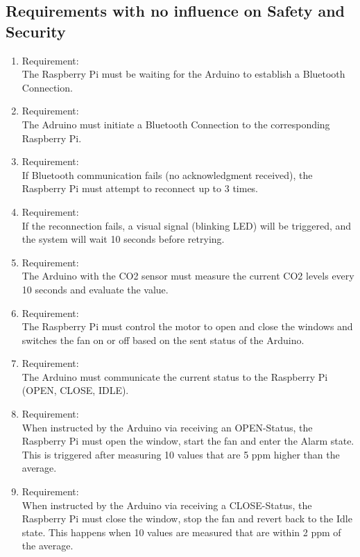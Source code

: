\subsection{Requirements with no influence on Safety and Security}
    \begin{enumerate}[label*=\arabic*.]
        \item \label{qreq.1}  Requirement:  \\
        The Raspberry Pi must be waiting for the Arduino to establish a Bluetooth Connection. \\ 
        \item \label{qreq.2}  Requirement:  \\
        The Adruino must initiate a Bluetooth Connection to the corresponding Raspberry Pi. \\ 
        \item \label{qreq.3}  Requirement:  \\
        If Bluetooth communication fails (no acknowledgment received), the Raspberry Pi must attempt to reconnect up to 3 times. \\ 
        \item \label{qreq.4}  Requirement:  \\
        If the reconnection fails, a visual signal (blinking LED) will be triggered, and the system will wait 10 seconds before retrying. \\ 
        \item \label{qreq.5}  Requirement:  \\
        The Arduino with the CO2 sensor must measure the current CO2 levels every 10 seconds and evaluate the value. \\ 
        \item \label{qreq.6}  Requirement:  \\
        The Raspberry Pi must control the motor to open and close the windows and switches the fan on or off based on the sent status of the Arduino.\\ 
        \item \label{qreq.7}  Requirement:  \\
        The Arduino must communicate the current status to the Raspberry Pi (OPEN, CLOSE, IDLE).\\ 
        \item \label{qreq.8}  Requirement:  \\
        When instructed by the Arduino via receiving an OPEN-Status, the Raspberry Pi must open the window, start the fan and enter the Alarm state. This is triggered after measuring 10 values that are 5 ppm higher than the average.\\ 
        \item \label{qreq.9}  Requirement:  \\
        When instructed by the Arduino via receiving a CLOSE-Status, the Raspberry Pi must close the window, stop the fan and revert back to the Idle state. This happens when 10 values are measured that are within 2 ppm of the average. \\ 
        
    \end{enumerate} 
    

